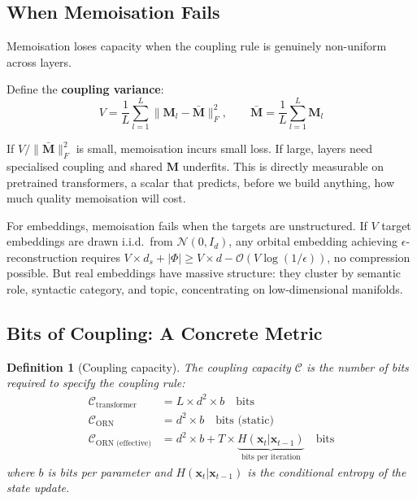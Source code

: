 \documentclass[11pt, a4paper]{article}
\newcommand{\M}{\mathbf{M}}
\newcommand{\x}{\mathbf{x}}
\newcommand{\bigO}{\mathcal{O}}
\newtheorem{definition}{Definition}
\theoremstyle{remark}
\begin{document}
\subsection{When Memoisation Fails}

Memoisation loses capacity when the coupling rule is genuinely non-uniform across layers.

Define the \textbf{coupling variance}:
\begin{equation}
    V = \frac{1}{L} \sum_{l=1}^{L} \| \M_l - \bar{\M} \|_F^2, \qquad \bar{\M} = \frac{1}{L}\sum_{l=1}^L \M_l
\end{equation}

If $V / \|\bar{\M}\|_F^2$ is small, memoisation incurs small loss.
If large, layers need specialised coupling and shared $\M$ underfits.
This is directly measurable on pretrained transformers, a scalar that predicts, before we build anything, how much quality memoisation will cost.

For embeddings, memoisation fails when the targets are unstructured.
If $V$ target embeddings are drawn i.i.d.\ from $\mathcal{N}(0, I_d)$, any orbital embedding achieving $\epsilon$-reconstruction requires $V \times d_s + |\Phi| \geq V \times d - \bigO(V \log(1/\epsilon))$, no compression possible.
But real embeddings have massive structure: they cluster by semantic role, syntactic category, and topic, concentrating on low-dimensional manifolds.


\subsection{Bits of Coupling: A Concrete Metric}

\begin{definition}[Coupling capacity]
The coupling capacity $\mathcal{C}$ is the number of bits required to specify the coupling rule:
\begin{align}
    \mathcal{C}_{\text{transformer}} &= L \times d^2 \times b \quad \text{bits} \\
    \mathcal{C}_{\text{ORN}} &= d^2 \times b \quad \text{bits (static)} \\
    \mathcal{C}_{\text{ORN (effective)}} &= d^2 \times b + T \times \underbrace{H(\x_t | \x_{t-1})}_{\text{bits per iteration}} \quad \text{bits}
\end{align}
where $b$ is bits per parameter and $H(\x_t | \x_{t-1})$ is the conditional entropy of the state update.
\end{definition}
\end{document}
